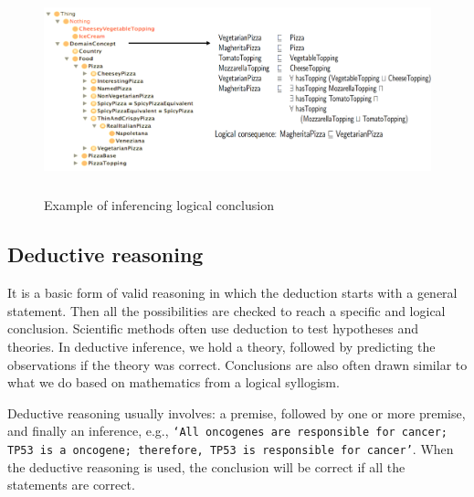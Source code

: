 \begin{figure}[h]
	\centering
	\includegraphics[width=0.9\linewidth,height=60mm]{images/reasoning.png}
	\caption{Example of inferencing logical conclusion} 
	\label{fig:pizza1}
	\vspace{-2mm}
\end{figure}

\subsection{Deductive reasoning} 
It is a basic form of valid reasoning in which the deduction starts with a general statement. Then all the possibilities are checked to reach a specific and logical conclusion. Scientific methods often use deduction to test hypotheses and theories. In deductive inference, we hold a theory, followed by predicting the observations if the theory was correct. Conclusions are also often drawn similar to what we do based on mathematics from a logical syllogism. 

Deductive reasoning usually involves: a premise, followed by one or more premise, and finally an inference, e.g., \texttt{`All oncogenes are responsible for cancer; TP53 is a oncogene; therefore, TP53 is responsible for cancer'}. When the deductive reasoning is used, the conclusion will be correct if all the statements are correct. 

